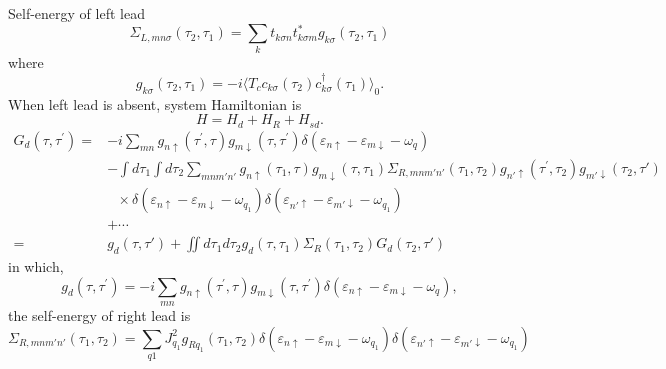 \documentclass[aps,prb,onecolumn,amssymb,amsmath,superscriptaddress]{revtex4-1}
\begin{document}
Self-energy of left lead
\begin{equation}
\Sigma_{L,mn\sigma}(\tau_{2}, \tau_{1}) = \sum_{k} t_{k\sigma n}t_{k\sigma m}^{*} g_{k\sigma}(\tau_{2}, \tau_{1})
\end{equation}
where
\begin{equation}
g_{k\sigma}(\tau_{2}, \tau_{1}) = -i\langle T_{c}c_{k\sigma}(\tau_{2}) c_{k\sigma}^{\dag}(\tau_{1})\rangle_{0}.
\label{eq:left-self-energy}
\end{equation}
When left lead is absent, system Hamiltonian is
\begin{equation}
H = H_{d} + H_{R} + H_{sd}.
\end{equation}
\begin{equation}
\begin{split}
G_{d}\left(\tau, \tau^{\prime}\right) =&-i\sum_{mn} g_{n \uparrow}\left(\tau^{\prime}, \tau\right) g_{m \downarrow}\left(\tau, \tau^{\prime}\right) \delta(\varepsilon_{n\uparrow} - \varepsilon_{m\downarrow} - \omega_{q})\\
&-\int d\tau_{1}\int d\tau_{2} \sum_{mnm'n'}g_{n \uparrow}\left(\tau_{1}, \tau\right) g_{m \downarrow}\left(\tau, \tau_{1}\right) \Sigma_{R,mnm'n' }\left(\tau_{1}, \tau_{2}\right) g_{n'\uparrow}\left(\tau^{\prime}, \tau_{2}\right)g_{m'\downarrow}(\tau_{2}, \tau') \\
&~~~\times \delta(\varepsilon_{n\uparrow} - \varepsilon_{m\downarrow} - \omega_{q_{1}})\delta(\varepsilon_{n'\uparrow} - \varepsilon_{m'\downarrow} - \omega_{q_{1}})\\
& + \cdots \\
=& g_{d}(\tau, \tau') + \iint d\tau_{1}d\tau_{2}g_{d}(\tau, \tau_{1}) \Sigma_{R}(\tau_{1}, \tau_{2}) G_{d}(\tau_{2}, \tau')
\end{split}
\end{equation}
in which, 
\begin{equation}
g_{d}\left(\tau, \tau^{\prime}\right) = -i\sum_{mn} g_{n \uparrow}\left(\tau^{\prime}, \tau\right) g_{m \downarrow}\left(\tau, \tau^{\prime}\right) \delta(\varepsilon_{n\uparrow} - \varepsilon_{m\downarrow} - \omega_{q}),
\end{equation}
the self-energy of right lead is
\begin{equation}
\Sigma_{R,mnm'n'}(\tau_{1}, \tau_{2}) = \sum_{q1}J_{q_{1}}^{2} g_{Rq_{1}}(\tau_{1}, \tau_{2}) \delta(\varepsilon_{n\uparrow} - \varepsilon_{m\downarrow} - \omega_{q_{1}})\delta(\varepsilon_{n'\uparrow} - \varepsilon_{m'\downarrow} - \omega_{q_{1}})
\end{equation}
\end{document}
